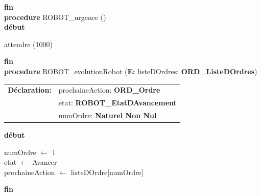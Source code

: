 \documentclass[a4paper, 11pt]{article}
\begin{document}
\noindent\textbf{fin}\\

\noindent\textbf{procedure} ROBOT\_urgence ()\\
\textbf{début}

    \begin{algorithm}[H]
        attendre (1000)        
    \end{algorithm}

\noindent\textbf{fin}\\

\noindent\textbf{procedure} ROBOT\_evolutionRobot (\textbf{E:} listeDOrdres: \textbf{ORD\_ListeDOrdres})

\begin{tabular}{ll}
    \textbf{Déclaration:} & prochaineAction: \textbf{ORD\_Ordre}\\
     & etat: \textbf{ROBOT\_EtatDAvancement}\\
     & numOrdre: \textbf{Naturel Non Nul}
\end{tabular}

\noindent\textbf{début}

    \begin{algorithm}[H]
        numOrdre $\leftarrow$ 1\\
        etat $\leftarrow$ Avancer\\
        prochaineAction $\leftarrow$ listeDOrdre[numOrdre]\\
    \end{algorithm}

    \noindent\textbf{fin}
\end{document}
